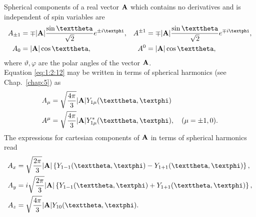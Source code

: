 Spherical components of a real vector \(\mathbf{A}\) which contains no derivatives and is independent of spin variables are
\begin{alignat}{2}
A_{ \pm 1} & =\mp|\vect{A}| \frac{\sin \vartheta}{\sqrt{2}} e^{ \pm i \varphi}, & A^{ \pm 1} & =\mp|\vect{A}| \frac{\sin \vartheta}{\sqrt{2}} e^{\mp i \varphi},  \notag\\
A_{0} & =|\vect{A}| \cos \vartheta, & A^{0} & =|\vect{A}| \cos \vartheta, \label{eq:1:2:12}
\end{alignat}
where \(\vartheta, \varphi\) are the polar angles of the vector \(\mathbf{A}\).\\
Equation \eqref{eq:1:2:12} may be written in terms of spherical harmonics (see Chap.~\ref{chap:5}) as
\begin{align}
A_{\mu} & =\sqrt{\frac{4 \pi}{3}}|\vect{A}| Y_{1 \mu}(\vartheta, \varphi)  \notag\\
A^{\mu} & =\sqrt{\frac{4 \pi}{3}}|\vect{A}| Y_{1 \mu}^{*}(\vartheta, \varphi), \quad(\mu= \pm 1,0). \label{eq:1:2:13}
\end{align}
The expressions for cartesian components of \(\mathbf{A}\) in terms of spherical harmonics read
\begin{align}
A_{x} & =\sqrt{\frac{2 \pi}{3}}|\vect{A}|\left\{Y_{1-1}(\vartheta, \varphi)-Y_{1+1}(\vartheta, \varphi)\right\},  \notag\\
A_{y} & =i \sqrt{\frac{2 \pi}{3}}|\vect{A}|\left\{Y_{1-1}(\vartheta, \varphi)+Y_{1+1}(\vartheta, \varphi)\right\},  \label{eq:1:2:14}\\
A_{z} & =\sqrt{\frac{4 \pi}{3}}|\vect{A}| Y_{10}(\vartheta, \varphi) .\notag
\end{align}

